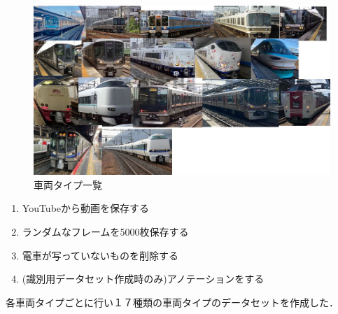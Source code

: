 \usepackage{subcaption}
\usepackage{comment}



\maketitle %
\addtocounter{page}{1}
\thispagestyle{myfirstpage}

\begin{figure}
	\centering
	\includegraphics[width=0.65\linewidth]{densya/densya}
	\caption[車両タイプ一覧]{車両タイプ一覧}
	\label{fig:densya}
\end{figure}



\begin{enumerate}
	\item YouTubeから動画を保存する
	\item ランダムなフレームを5000枚保存する
	\item 電車が写っていないものを削除する
	\item  (識別用データセット作成時のみ)アノテーションをする
\end{enumerate}
各車両タイプごとに行い１７種類の車両タイプのデータセットを作成した．

